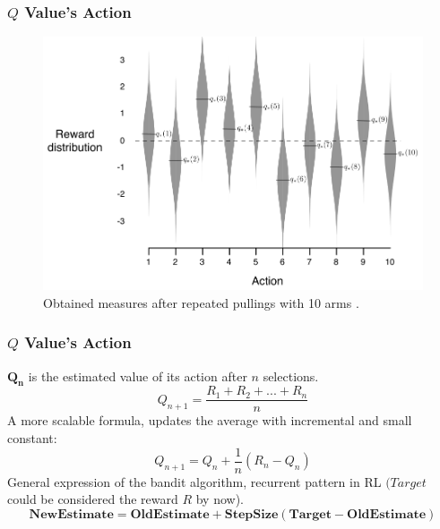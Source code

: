 \documentclass[aspectratio=169]{beamer}
\begin{document}
\begin{frame}
	\frametitle{\begin{math} Q \end{math} Value's Action}
	\begin{figure}[t!]
		\centering
		\includegraphics[scale=0.25]{img/bandit-reward-dist.png}
		\caption{Obtained measures after repeated pullings with 10 arms \cite{Montague1999}.}
	\end{figure}
\end{frame}

\begin{frame}
	\frametitle{\begin{math} Q \end{math} Value's Action}
	\begin{math} \mathbf{Q_n} \end{math} is the estimated value of its action after $ n $ selections.	
	$$ Q_{n+1} = \frac{R_1 +R_2 + ... +R_{n}}{n} $$
	A more scalable formula, updates the average with incremental and small constant:
	$$ Q_{n+1} = Q_n + \frac{1}{n}(R_n-Q_n)$$
	General expression of the bandit algorithm, recurrent pattern in RL \begin{math}(Target\end{math} could be considered the reward $ R $ by now).
	$$ \mathbf{NewEstimate = OldEstimate + StepSize(Target-OldEstimate)}$$
\end{frame}
\end{document}
